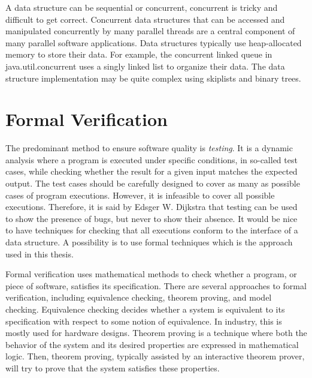 A data structure can be sequential or concurrent, concurrent is tricky and difficult to get correct. Concurrent data structures that can be accessed and manipulated concurrently by many parallel threads are a central component of many parallel software applications. Data structures typically use heap-allocated memory to store their data. For example, the concurrent linked queue in java.util.concurrent uses a singly linked list to organize their data. The data structure implementation may be quite complex using skiplists and binary trees.




\section{Formal Verification} 
The predominant method to ensure software quality is
\emph{testing}. It is a dynamic analysis where a program is executed under specific conditions, in so-called test cases, while checking whether the result for a given input matches the expected output.
%
The test cases should be carefully designed to cover as many as possible cases of program executions.
However, it is infeasible to cover all possible executions. Therefore, it is said by Edsger W. Dijkstra that testing can be used to show the presence of bugs, but never to show their absence. 
It would be nice to have techniques for checking that all executions conform to the interface of a data structure.
A possibility is to use formal techniques which is the approach used in this thesis.

Formal verification uses mathematical methods to check whether a program, or piece of software, satisfies its specification. 
There are several approaches to formal verification, including equivalence checking, theorem proving, and model checking. Equivalence checking decides whether a system is equivalent to its specification with respect to some notion of equivalence. In industry, this is mostly used for hardware designs. Theorem proving is a technique where both the behavior of the system and its desired properties are expressed in mathematical logic. Then, theorem proving, typically assisted by an interactive theorem prover, will try to prove that the system satisfies these properties. 

